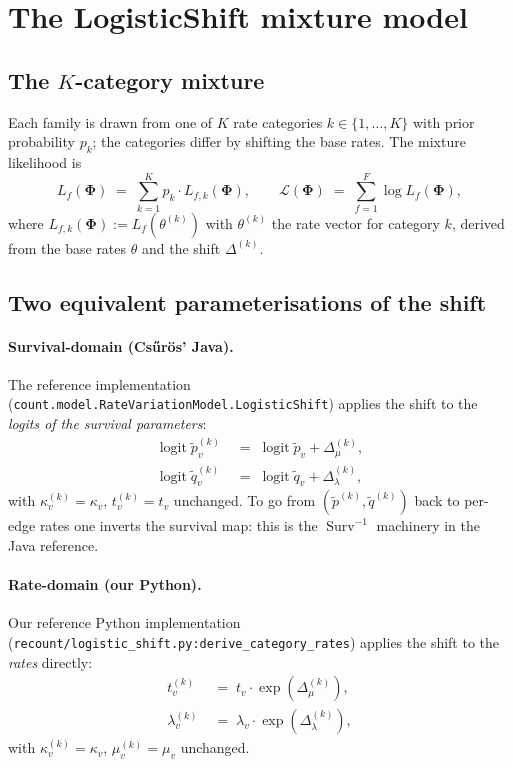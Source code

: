 \documentclass[11pt]{article}
\newcommand{\rate}{\kappa}
\newcommand{\dup}{\lambda}
\newcommand{\loss}{\mu}
\newcommand{\edgelen}{t}
\newcommand{\survp}{\tilde p}
\newcommand{\survq}{\tilde q}
\newcommand{\Ll}{\mathcal{L}}
\DeclareMathOperator{\logit}{logit}
\DeclareMathOperator{\Surv}{Surv}
\theoremstyle{definition}
\begin{document}
\section{The LogisticShift mixture model}
\label{sec:shift-model}

\subsection{The $K$-category mixture}

Each family is drawn from one of $K$ rate categories
$k \in \{1, \dots, K\}$ with prior probability $p_k$; the
categories differ by shifting the base rates.  The mixture
likelihood is
\begin{equation}
L_f(\bm\Phi) \;=\; \sum_{k=1}^K p_k \cdot L_{f,k}(\bm\Phi),
\qquad
\Ll(\bm\Phi) \;=\; \sum_{f=1}^F \log L_f(\bm\Phi),
\label{eq:mix-LL}
\end{equation}
where $L_{f,k}(\bm\Phi) := L_f(\theta^{(k)})$ with
$\theta^{(k)}$ the rate vector for category $k$, derived from the
base rates $\theta$ and the shift $\Delta^{(k)}$.

\subsection{Two equivalent parameterisations of the shift}
\label{sec:two-paramz}

\paragraph{Survival-domain (Cs\H{u}r\"os' Java).}
The reference implementation
(\texttt{count.model.RateVariationModel.LogisticShift}) applies the
shift to the \emph{logits of the survival parameters}:
\begin{align}
\logit\survp^{(k)}_v \;&=\; \logit\survp_v + \Delta_\loss^{(k)},
\label{eq:shift-p}\\
\logit\survq^{(k)}_v \;&=\; \logit\survq_v + \Delta_\dup^{(k)},
\label{eq:shift-q}
\end{align}
with $\rate^{(k)}_v = \rate_v$, $\edgelen^{(k)}_v = \edgelen_v$
unchanged. To go from $(\survp^{(k)}, \survq^{(k)})$ back to
per-edge rates one inverts the survival map: this is the
$\Surv^{-1}$ machinery in the Java reference.

\paragraph{Rate-domain (our Python).}
Our reference Python implementation
(\texttt{recount/logistic\_shift.py:derive\_category\_rates}) applies
the shift to the \emph{rates} directly:
\begin{align}
\edgelen^{(k)}_v \;&=\; \edgelen_v \cdot \exp(\Delta_\loss^{(k)}),
\label{eq:shift-t}\\
\dup^{(k)}_v \;&=\; \dup_v \cdot \exp(\Delta_\dup^{(k)}),
\label{eq:shift-lam}
\end{align}
with $\rate^{(k)}_v = \rate_v$, $\loss^{(k)}_v = \loss_v$ unchanged.
\end{document}
